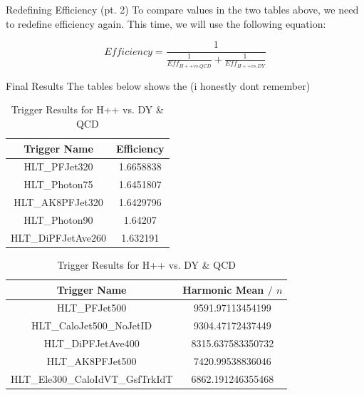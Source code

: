 \documentclass{beamer}
\newlength{\colwidth}
\begin{document}
\begin{frame}[t]
\begin{columns}[t]
\begin{column}{\colwidth}
  \begin{block}{Redefining Efficiency (pt. 2)}
    To compare values in the two tables above, we need to redefine efficiency again. This time, we will use the following equation:

    $$Efficiency = \frac{1}{\frac{1}{Eff_{H++ vs. QCD}} + \frac{1}{Eff_{H++ vs. DY}}}$$
  \end{block}

  \begin{block}{Final Results}
    The tables below shows the (i honestly dont remember)

    \begin{table}[h!]
      \caption{\label{table:6}Trigger Results for H++ vs. DY \& QCD}
          \begin{tabular}[t]{c|c}
              \hline
              \textbf{Trigger Name} & \textbf{Efficiency}\\
              \hline
              HLT\_PFJet320 & 1.6658838 \\
              HLT\_Photon75 & 1.6451807 \\
              HLT\_AK8PFJet320 & 1.6429796 \\
              HLT\_Photon90 & 1.64207 \\
              HLT\_DiPFJetAve260 & 1.632191
          \end{tabular}
  \end{table}

  \begin{table}[h!]
    \caption{\label{table:6}Trigger Results for H++ vs. DY \& QCD}
        \begin{tabular}[t]{c|c}
            \hline
            \textbf{Trigger Name} & \textbf{Harmonic Mean $/$ $n$}\\
            \hline
                HLT\_PFJet500 & 9591.97113454199 \\
                HLT\_CaloJet500\_NoJetID & 9304.47172437449 \\
                HLT\_DiPFJetAve400 & 8315.637583350732 \\
                HLT\_AK8PFJet500 & 7420.99538836046 \\
                HLT\_Ele300\_CaloIdVT\_GsfTrkIdT & 6862.191246355468
        \end{tabular}
\end{table}
  \end{block}

\end{column}


\end{columns}
\end{frame}
\end{document}
